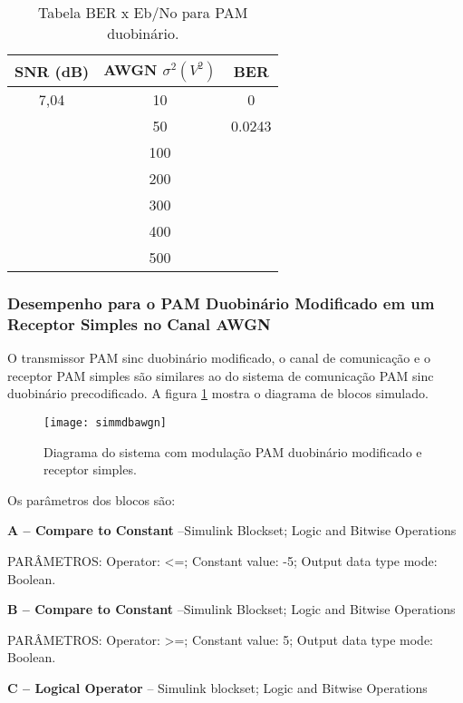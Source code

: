 \begin{table}[H]
  \begin{center}
    \caption{Tabela BER x Eb/No para PAM duobinário.}
    \begin{tabular}{|c|c|c|}
      \hline
      SNR (dB) & AWGN $\sigma^2 (V^2)$ & BER \\
      \hline
      7,04 & 10 & 0 \\
      \hline
       & 50 & 0.0243 \\
      \hline
       & 100 & \\
      \hline
       & 200 & \\
      \hline
       & 300 & \\
      \hline
       & 400 & \\
      \hline 
       & 500 & \\
      \hline
    \end{tabular}
    \label{tab:simdb}
  \end{center}
\end{table}

\subsubsection{Desempenho para o PAM Duobinário Modificado em um Receptor Simples no Canal AWGN}

O transmissor PAM sinc duobinário modificado, o canal de comunicação e o receptor PAM simples são similares ao do sistema de comunicação PAM sinc duobinário precodificado. A figura \ref{fig:simmdbawgn} mostra o diagrama de blocos simulado.

\begin{figure}[H]
  \centering
  \caption{Diagrama do sistema com modulação PAM duobinário modificado e receptor simples.}
  \texttt{[image: simmdbawgn]}
  \label{fig:simmdbawgn}
\end{figure}

Os parâmetros dos blocos são:

\textbf{A – Compare to Constant} –Simulink Blockset; Logic and Bitwise Operations

PARÂMETROS: Operator: <=; Constant value: -5; Output data type mode: Boolean.

\textbf{B – Compare to Constant} –Simulink Blockset; Logic and Bitwise Operations

PARÂMETROS: Operator: >=; Constant value: 5; Output data type mode: Boolean.

\textbf{C – Logical Operator} – Simulink blockset; Logic and Bitwise Operations

